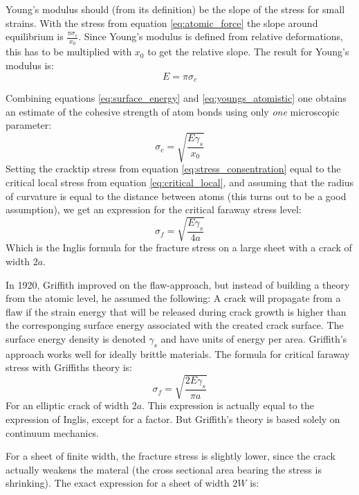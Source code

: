 Young's modulus should (from its definition) be the slope of the stress for small strains. With the stress from equation \ref{eq:atomic_force} the slope around equilibrium is $\frac{\pi\sigma_c}{x_0}$. Since Young's modulus is defined from relative deformations, this has to be multiplied with $x_0$ to get the relative slope. The result for Young's modulus is:
\begin{equation}
E = \pi\sigma_c
\label{eq:youngs_atomistic}
\end{equation}

Combining equations \ref{eq:surface_energy} and \ref{eq:youngs_atomistic} one obtains an estimate of the cohesive strength of atom bonds using only \emph{one} microscopic parameter:
\begin{equation}
	\sigma_c = \sqrt{\frac{E\gamma_s}{x_0}}
	\label{eq:critical_local}
\end{equation}
Setting the cracktip stress from equation \ref{eq:stress_consentration} equal to the critical local stress from equation \ref{eq:critical_local}, and assuming that the radius of curvature is equal to the distance between atoms (this turns out to be a good assumption), we get an expression for the critical faraway stress level:
\begin{equation}
	\sigma_f = \sqrt{\frac{E\gamma_s}{4a}}
	\label{eq:inglis_formula}
\end{equation}
Which is the Inglis formula for the fracture stress on a large sheet with a crack of width $2a$.

In 1920, Griffith improved on the flaw-approach, but instead of building a theory from the atomic level, he assumed the following: A crack will propagate from a flaw if the strain energy that will be released during crack growth is higher than the corresponging surface energy associated with the created crack surface. The surface energy density is denoted $\gamma_s$ and have units of energy per area. Griffith's approach works well for ideally brittle materials. The formula for critical faraway stress with Griffiths theory is:
\begin{equation}
	\sigma_f = \sqrt{\frac{2E\gamma_s}{\pi a}}
\end{equation}
For an elliptic crack of width $2a$. This expression is actually equal to the expression of Inglis, except for a factor. But Griffith's theory is based solely on continuum mechanics.

 For a sheet of finite width, the fracture stress is slightly lower, since the crack actually weakens the materal (the cross sectional area bearing the stress is shrinking). The exact expression for a sheet of width $2W$ is:

